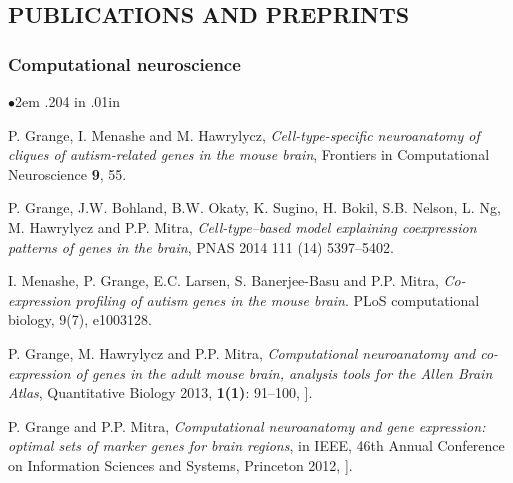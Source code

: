 \documentclass[a4paper, 12pt]{scrartcl}
\newcommand{\pubSpace}{\vspace{-0.27in}}
\begin{document}
\subsection*{ \sc\bf PUBLICATIONS AND PREPRINTS}
\subsubsection*{\sc \bf Computational neuroscience}
\begin{list}{$\bullet$}{ 2em \leftmargin .204 in \itemsep .01in }
\item  P. Grange,  I. Menashe and M. Hawrylycz, {\emph{Cell-type-specific neuroanatomy of cliques of autism-related genes in the mouse brain}}, Frontiers in Computational Neuroscience {\bf{9}}, 55.
\item  P. Grange, J.W. Bohland, B.W. Okaty, K. Sugino, H. Bokil, S.B. Nelson, L. Ng,
    M. Hawrylycz and P.P. Mitra, {\emph{Cell-type–based model explaining coexpression patterns of genes in the brain}},
    PNAS 2014 111 (14) 5397--5402.
\item  I. Menashe, P. Grange, E.C. Larsen, S. Banerjee-Basu and P.P. Mitra,
 {\emph{Co-expression profiling of autism genes in the mouse brain}}. PLoS computational biology, 9(7), e1003128.\\ \pubSpace
\item \vspace{-.02in} P. Grange, M. Hawrylycz and P.P. Mitra, {\emph{Computational neuroanatomy and co-expression of genes in the adult mouse
brain, analysis tools for the Allen Brain Atlas}}, Quantitative Biology 2013, {\bf{1(1)}}: 91--100, {\ttfamily [arXiv:1301.1730 [q-bio.QM]]}.\\ \pubSpace 
\item \vspace{-.02in} P. Grange and P.P. Mitra, {\emph{Computational neuroanatomy and gene expression: optimal sets of marker genes for brain regions}}, in IEEE, 46th Annual Conference on Information Sciences and Systems, Princeton 2012, {\ttfamily [arXiv:1205.2721 [q-bio.QM]]}.\\ \pubSpace  
\end{list} 
\vspace {-.25in}
\end{document}
